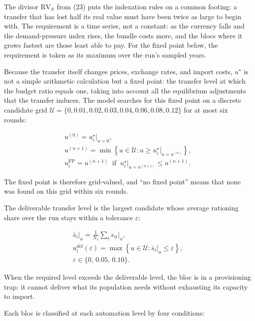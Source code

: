 \documentclass[preprint,review,12pt]{elsarticle}
\begin{document}
The divisor \(\mathrm{RV}_{it}\) from (23) puts the indexation rules on
a common footing: a transfer that has lost half its real value must have
been twice as large to begin with. The requirement is a time series, not
a constant: as the currency falls and the demand-pressure index rises,
the bundle costs more, and the blocs where it grows fastest are those
least able to pay. For the fixed point below, the requirement is taken
as its maximum over the run's sampled years.

Because the transfer itself changes prices, exchange rates, and import
costs, \(u^\star\) is not a simple arithmetic calculation but a fixed
point: the transfer level at which the budget ratio equals one, taking
into account all the equilibrium adjustments that the transfer induces.
The model searches for this fixed point on a discrete candidate grid
\(\mathcal{U} = \{0, 0.01, 0.02, 0.03, 0.04, 0.06, 0.08, 0.12\}\) for at
most six rounds:

\[\begin{gathered} u^{(0)} = u^\star_i \big|_{u=0}, \\ u^{(n+1)} = \min\left\{ u \in \mathcal{U} : u \ge u^\star_i \big|_{u = u^{(n)}} \right\}, \\ u^{\mathrm{FP}}_i = u^{(n+1)} \;\; \text{if} \;\; u^\star_i \big|_{u = u^{(n+1)}} \le u^{(n+1)}. \end{gathered} \tag{44}\]

The fixed point is therefore grid-valued, and ``no fixed point'' means
that none was found on this grid within six rounds.

The deliverable transfer level is the largest candidate whose average
rationing share over the run stays within a tolerance \(\varepsilon\):

\[\begin{gathered} \bar{s}_i \big|_u = \frac{1}{N_s} \sum_t s_{it} \big|_u, \\ u^{\mathrm{del}}_i(\varepsilon) = \max\left\{ u \in \mathcal{U} : \bar{s}_i \big|_u \le \varepsilon \right\}, \\ \varepsilon \in \{0,\, 0.05,\, 0.10\}. \end{gathered} \tag{45}\]

When the required level exceeds the deliverable level, the bloc is in a
provisioning trap: it cannot deliver what its population needs without
exhausting its capacity to import.

Each bloc is classified at each automation level by four conditions:
\end{document}
